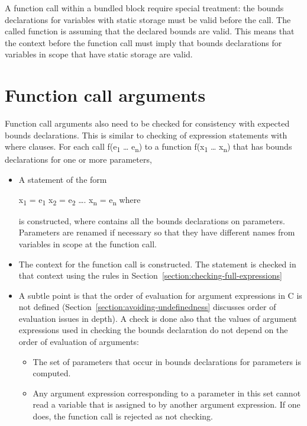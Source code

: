 A function call within a bundled block require special treatment: the
bounds declarations for variables with static storage must be valid
before the call. The called function is assuming that the declared
bounds are valid. This means that the context before the function call
must imply that bounds declarations for variables in scope that have
static storage are valid.

\section{Function call arguments}
\label{section:checking-function-call-arguments}

Function call arguments also need to be checked for consistency with
expected bounds declarations. This is similar to checking of expression
statements with where clauses. For each call f(e\textsubscript{1}
\ldots{} e\textsubscript{n}) to a function f(x\textsubscript{1} \ldots{}
x\textsubscript{n}) that has bounds declarations for one or more
parameters,

\begin{itemize}
\item
  A statement of the form

  x\textsubscript{1} = e\textsubscript{1} \code{,} x\textsubscript{2} = 
  e\textsubscript{2} \code{,} \ldots{}. x\textsubscript{n} =
  e\textsubscript{n} where \code{;}

  is constructed, where  contains all the bounds
  declarations on parameters. Parameters are renamed if necessary so
  that they have different names from variables in scope at the function
  call.
\item
  The context for the function call is constructed. The statement is
  checked in that context using the rules in 
  Section~\ref{section:checking-full-expressions}
\item
  A subtle point is that the order of evaluation for argument
  expressions in C is not defined (Section~\ref{section:avoiding-undefinedness}
  discusses order of
  evaluation issues in depth). A check is done also that the values of
  argument expressions used in checking the bounds declaration do not
  depend on the order of evaluation of arguments:

  \begin{itemize}
  \item
    The set of parameters that occur in bounds declarations for
    parameters is computed.
  \item
    Any argument expression corresponding to a parameter in this set
    cannot read a variable that is assigned to by another argument
    expression. If one does, the function call is rejected as not
    checking.
  \end{itemize}
\end{itemize}

